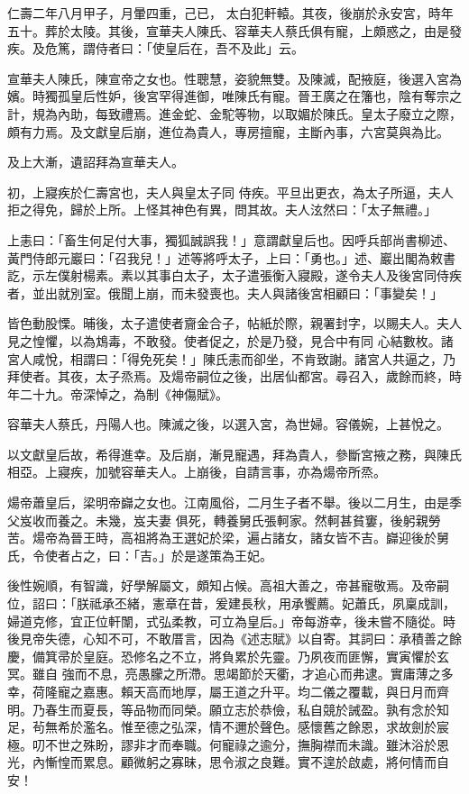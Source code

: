 \begin{pinyinscope}
 仁壽二年八月甲子，月暈四重，己已，
 太白犯軒轅。其夜，後崩於永安宮，時年五十。葬於太陵。其後，宣華夫人陳氏、容華夫人蔡氏俱有寵，上頗惑之，由是發疾。及危篤，謂侍者曰：「使皇后在，吾不及此」云。



 宣華夫人陳氏，陳宣帝之女也。性聰慧，姿貌無雙。及陳滅，配掖庭，後選入宮為嬪。時獨孤皇后性妒，後宮罕得進御，唯陳氏有寵。晉王廣之在籓也，陰有奪宗之計，規為內助，每致禮焉。進金蛇、金駝等物，以取媚於陳氏。皇太子廢立之際，頗有力焉。及文獻皇后崩，進位為貴人，專房擅寵，主斷內事，六宮莫與為比。



 及上大漸，遺詔拜為宣華夫人。



 初，上寢疾於仁壽宮也，夫人與皇太子同
 侍疾。平旦出更衣，為太子所逼，夫人拒之得免，歸於上所。上怪其神色有異，問其故。夫人泫然曰：「太子無禮。」



 上恚曰：「畜生何足付大事，獨狐誠誤我！」意謂獻皇后也。因呼兵部尚書柳述、黃門侍郎元巖曰：「召我兒！」述等將呼太子，上曰：「勇也。」述、巖出閣為敕書訖，示左僕射楊素。素以其事白太子，太子遣張衡入寢殿，遂令夫人及後宮同侍疾者，並出就別室。俄聞上崩，而未發喪也。夫人與諸後宮相顧曰：「事變矣！」



 皆色動股慄。晡後，太子遣使者齎金合子，帖紙於際，親署封字，以賜夫人。夫人見之惶懼，以為鴆毒，不敢發。使者促之，於是乃發，見合中有同
 心結數枚。諸宮人咸悅，相謂曰：「得免死矣！」陳氏恚而卻坐，不肯致謝。諸宮人共逼之，乃拜使者。其夜，太子烝焉。及煬帝嗣位之後，出居仙都宮。尋召入，歲餘而終，時年二十九。帝深悼之，為制《神傷賦》。



 容華夫人蔡氏，丹陽人也。陳滅之後，以選入宮，為世婦。容儀婉，上甚悅之。



 以文獻皇后故，希得進幸。及后崩，漸見寵遇，拜為貴人，參斷宮掖之務，與陳氏相亞。上寢疾，加號容華夫人。上崩後，自請言事，亦為煬帝所烝。



 煬帝蕭皇后，梁明帝巋之女也。江南風俗，二月生子者不舉。後以二月生，由是季父岌收而養之。未幾，岌夫妻
 俱死，轉養舅氏張軻家。然軻甚貧窶，後躬親勞苦。煬帝為晉王時，高祖將為王選妃於梁，遍占諸女，諸女皆不吉。巋迎後於舅氏，令使者占之，曰：「吉。」於是遂策為王妃。



 後性婉順，有智識，好學解屬文，頗知占候。高祖大善之，帝甚寵敬焉。及帝嗣位，詔曰：「朕祗承丕緒，憲章在昔，爰建長秋，用承饗薦。妃蕭氏，夙稟成訓，婦道克修，宜正位軒闈，式弘柔教，可立為皇后。」帝每游幸，後未嘗不隨從。時後見帝失德，心知不可，不敢厝言，因為《述志賦》以自寄。其詞曰：承積善之餘慶，備箕帚於皇庭。恐修名之不立，將負累於先靈。乃夙夜而匪懈，實寅懼於玄冥。雖自
 強而不息，亮愚朦之所滯。思竭節於天衢，才追心而弗逮。實庸薄之多幸，荷隆寵之嘉惠。賴天高而地厚，屬王道之升平。均二儀之覆載，與日月而齊明。乃春生而夏長，等品物而同榮。願立志於恭儉，私自競於誡盈。孰有念於知足，茍無希於濫名。惟至德之弘深，情不邇於聲色。感懷舊之餘恩，求故劍於宸極。叨不世之殊盼，謬非才而奉職。何寵祿之逾分，撫胸襟而未識。雖沐浴於恩光，內慚惶而累息。顧微躬之寡昧，思令淑之良難。實不遑於啟處，將何情而自安！




\end{pinyinscope}
